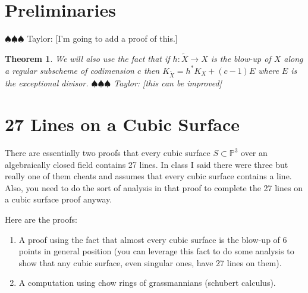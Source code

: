 \documentclass[12pt]{article}
\numberwithin{equation}{section}
\newtheorem{theorem}{Theorem}[subsection]
\theoremstyle{definition}
\theoremstyle{remark}
\newcommand{\PP}{\mathbb{P}}
\newcommand{\Bl}{\operatorname{Bl}}
\newcommand{\taylor}[1]{{\color{blue} \sf $\spadesuit\spadesuit\spadesuit$ Taylor: [#1]}}
\begin{document}

\section{Preliminaries}
\taylor{I'm going to add a proof of this.}
\begin{theorem}\label{thm:canonical-of-blow-up}
	We will also use the fact that if $h:\widetilde{X} \to X$ is the blow-up of $X$ along a regular subscheme of codimension $c$ then $K_{\widetilde{X}} = h^*K_X+(c-1)E$ where $E$ is the exceptional divisor. \taylor{this can be improved}
\end{theorem}

\section{27 Lines on a Cubic Surface}
There are essentially two proofs that every cubic surface $S\subset \PP^3$ over an algebraically closed field contains 27 lines. 
In class I said there were three but really one of them cheats and assumes that every cubic surface contains a line. 
Also, you need to do the sort of analysis in that proof to complete the 27 lines on a cubic surface proof anyway.

Here are the proofs:
\begin{enumerate}
	\item A proof using the fact that almost every cubic surface is the blow-up of 6 points in general position (you can leverage this fact to do some analysis to show that any cubic surface, even singular ones, have 27 lines on them).
	\item A computation using chow rings of grassmannians (schubert calculus).
\end{enumerate}
\end{document}
